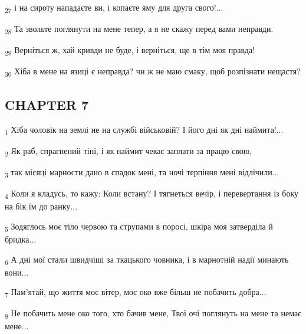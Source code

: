 \begin{tcolorbox}
\textsubscript{27} і на сироту нападаєте ви, і копаєте яму для друга свого!...
\end{tcolorbox}
\begin{tcolorbox}
\textsubscript{28} Та звольте поглянути на мене тепер, а я не скажу перед вами неправди.
\end{tcolorbox}
\begin{tcolorbox}
\textsubscript{29} Верніться ж, хай кривди не буде, і верніться, ще в тім моя правда!
\end{tcolorbox}
\begin{tcolorbox}
\textsubscript{30} Хіба в мене на язиці є неправда? чи ж не маю смаку, щоб розпізнати нещастя?
\end{tcolorbox}
\subsection{CHAPTER 7}
\begin{tcolorbox}
\textsubscript{1} Хіба чоловік на землі не на службі військовій? І його дні як дні наймита!...
\end{tcolorbox}
\begin{tcolorbox}
\textsubscript{2} Як раб, спрагнений тіні, і як наймит чекає заплати за працю свою,
\end{tcolorbox}
\begin{tcolorbox}
\textsubscript{3} так місяці марности дано в спадок мені, та ночі терпіння мені відлічили...
\end{tcolorbox}
\begin{tcolorbox}
\textsubscript{4} Коли я кладусь, то кажу: Коли встану? І тягнеться вечір, і перевертання із боку на бік їм до ранку...
\end{tcolorbox}
\begin{tcolorbox}
\textsubscript{5} Зодяглось моє тіло червою та струпами в поросі, шкіра моя затверділа й бридка...
\end{tcolorbox}
\begin{tcolorbox}
\textsubscript{6} А дні мої стали швидчіші за ткацького човника, і в марнотній надії минають вони...
\end{tcolorbox}
\begin{tcolorbox}
\textsubscript{7} Пам'ятай, що життя моє вітер, моє око вже більш не побачить добра...
\end{tcolorbox}
\begin{tcolorbox}
\textsubscript{8} Не побачить мене око того, хто бачив мене, Твої очі поглянуть на мене та немає мене...
\end{tcolorbox}
